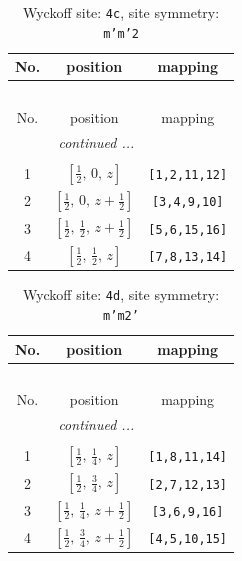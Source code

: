 \documentclass[fleqn,8pt]{jsarticle}
\begin{document}
\renewcommand{\arraystretch}{1.2}
\begin{longtable}{ccc}
\caption{Wyckoff site: {\tt 4c}, site symmetry: {\tt m'm'2}}
 \\
 \hline \hline
No. & position & mapping \\ \hline \endfirsthead

\multicolumn{2}{l}{\tablename\ \thetable{}} \\
 \hline \hline
No. & position & mapping \\ \hline \endhead

 \hline \hline
\multicolumn{2}{r}{\footnotesize\it continued ...} \\ \endfoot

 \hline \hline
\multicolumn{2}{r}{} \\ \endlastfoot

1 & $\left[ \frac{1}{2},\, 0,\, z \right]$ & {\tt [1,2,11,12]} \\ \hline
2 & $\left[ \frac{1}{2},\, 0,\, z + \frac{1}{2} \right]$ & {\tt [3,4,9,10]} \\ \hline
3 & $\left[ \frac{1}{2},\, \frac{1}{2},\, z + \frac{1}{2} \right]$ & {\tt [5,6,15,16]} \\ \hline
4 & $\left[ \frac{1}{2},\, \frac{1}{2},\, z \right]$ & {\tt [7,8,13,14]} \\
\end{longtable}
\renewcommand{\arraystretch}{1.2}
\begin{longtable}{ccc}
\caption{Wyckoff site: {\tt 4d}, site symmetry: {\tt m'm2'}}
 \\
 \hline \hline
No. & position & mapping \\ \hline \endfirsthead

\multicolumn{2}{l}{\tablename\ \thetable{}} \\
 \hline \hline
No. & position & mapping \\ \hline \endhead

 \hline \hline
\multicolumn{2}{r}{\footnotesize\it continued ...} \\ \endfoot

 \hline \hline
\multicolumn{2}{r}{} \\ \endlastfoot

1 & $\left[ \frac{1}{2},\, \frac{1}{4},\, z \right]$ & {\tt [1,8,11,14]} \\ \hline
2 & $\left[ \frac{1}{2},\, \frac{3}{4},\, z \right]$ & {\tt [2,7,12,13]} \\ \hline
3 & $\left[ \frac{1}{2},\, \frac{1}{4},\, z + \frac{1}{2} \right]$ & {\tt [3,6,9,16]} \\ \hline
4 & $\left[ \frac{1}{2},\, \frac{3}{4},\, z + \frac{1}{2} \right]$ & {\tt [4,5,10,15]} \\
\end{longtable}
\end{document}
